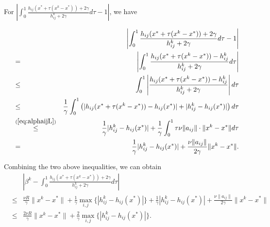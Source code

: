 \documentclass[12pt]{article}
\newcommand{\newalpha}{h}
\begin{document}
\noindent For $\left| \int_{0}^1 \frac{\newalpha_{ij}(x^* + \tau(x^k - x^*)) + 2\gamma}{ h_{ij}^k + 2\gamma} d\tau - 1   \right|$, we have 

\begin{eqnarray*}
	&& \left| \int_{0}^1 \frac{\newalpha_{ij}(x^* + \tau(x^k - x^*)) + 2\gamma}{ h_{ij}^k + 2\gamma} d\tau - 1   \right| \\ 
	&=& \left|  \int_{0}^1  \frac{\newalpha_{ij}(x^* + \tau(x^k - x^*)) - h_{ij}^k}{ h_{ij}^k + 2\gamma} d\tau  \right| \\ 
	&\leq& \int_{0}^1 \left|   \frac{\newalpha_{ij}(x^* + \tau(x^k - x^*)) - h_{ij}^k}{ h_{ij}^k + 2\gamma}  \right| d\tau \\ 
	&\leq& \frac{1}{\gamma} \int_{0}^1 \left(  |\newalpha_{ij}(x^* + \tau(x^k - x^*)) - \newalpha_{ij}(x^*)| + |h_{ij}^k - \newalpha_{ij}(x^*)|  \right) d\tau \\ 
	&\overset{(\ref{eq:alphaijL})}{\leq}& \frac{1}{\gamma} |h_{ij}^k - \newalpha_{ij}(x^*)| + \frac{1}{\gamma} \int_{0}^1 \tau \nu \|a_{ij}\| \cdot \|x^k - x^*\| d\tau \\ 
	&=& \frac{1}{\gamma} |h_{ij}^k - \newalpha_{ij}(x^*)|  + \frac{\nu \|a_{ij}\|}{2\gamma} \|x^k - x^*\|. 
\end{eqnarray*}

\noindent Combining the two above inequalities, we can obtain 
\begin{eqnarray}
&& \left|   \beta^k - \int_{0}^1 \frac{\newalpha_{ij}(x^* + \tau(x^k - x^*)) + 2\gamma}{ h_{ij}^k + 2\gamma} d\tau   \right| \nonumber \\ 
&\leq& \frac{\nu R}{\gamma} \|x^k - x^*\| + \frac{1}{\gamma} \max_{i, j} \{|h_{ij}^k - \newalpha_{ij}(x^*)| \} + \frac{1}{\gamma} |h_{ij}^k - \newalpha_{ij}(x^*)|  + \frac{\nu \|a_{ij}\|}{2\gamma} \|x^k - x^*\| \nonumber \\ 
&\leq&  \frac{2\nu R}{\gamma} \|x^k - x^*\| + \frac{2}{\gamma} \max_{i, j} \{|h_{ij}^k - \newalpha_{ij}(x^*)| \}. \label{eq:betak-2}
\end{eqnarray}
\end{document}
